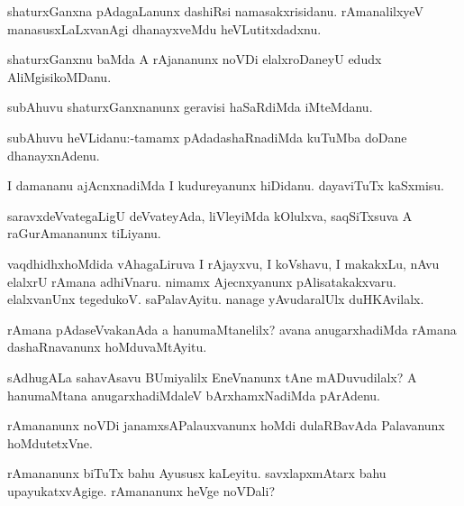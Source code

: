 \documentclass{article}
\begin{document}
\begin{mn}%
shaturxGanxna pAdagaLanunx dashiRsi namasakxrisidanu. rAmanalilxyeV manasusxLaLxvanAgi 
dhanayxveMdu heVLutitxdadxnu.
\end{mn}

\begin{mn}%
shaturxGanxnu baMda A rAjananunx noVDi elalxroDaneyU edudx AliMgisikoMDanu.
\end{mn}

\begin{mn}%
subAhuvu shaturxGanxnanunx geravisi haSaRdiMda iMteMdanu. 
\end{mn}

\begin{mn}%
subAhuvu heVLidanu:-tamamx pAdadashaRnadiMda kuTuMba doDane dhanayxnAdenu.
\end{mn}

\begin{mn}%
I damananu ajAcnxnadiMda I kudureyanunx hiDidanu. dayaviTuTx kaSxmisu.
\end{mn}

\begin{mn}%
saravxdeVvategaLigU deVvateyAda, liVleyiMda kOlulxva, saqSiTxsuva A raGurAmananunx tiLiyanu.
\end{mn}

\begin{mn}%
vaqdhidhxhoMdida vAhagaLiruva I rAjayxvu, I koVshavu, I makakxLu, nAvu elalxrU rAmana 
adhiVnaru. nimamx Ajecnxyanunx pAlisatakakxvaru. elalxvanUnx tegedukoV. saPalavAyitu. 
nanage yAvudaralUlx duHKAvilalx.
\end{mn}

\begin{mn}%
rAmana pAdaseVvakanAda a hanumaMtanelilx? avana anugarxhadiMda rAmana dashaRnavanunx 
hoMduvaMtAyitu.
\end{mn}

\begin{mn}%
sAdhugALa sahavAsavu BUmiyalilx EneVnanunx tAne mADuvudilalx? A hanumaMtana anugarxhadiMdaleV
bArxhamxNadiMda pArAdenu.
\end{mn}

\begin{mn}%
rAmananunx noVDi janamxsAPalauxvanunx hoMdi dulaRBavAda Palavanunx hoMdutetxVne.
\end{mn}

\begin{mn}%
rAmananunx biTuTx bahu Ayususx kaLeyitu. savxlapxmAtarx bahu upayukatxvAgige. rAmananunx 
heVge noVDali?
\end{mn}
\end{document}
